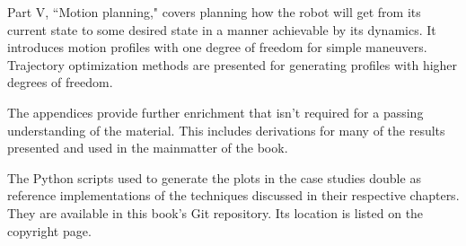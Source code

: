 Part V, ``Motion planning," covers planning how the robot will get from its
current state to some desired state in a manner achievable by its dynamics.
It introduces motion profiles with one degree of freedom for simple maneuvers.
Trajectory optimization methods are presented for generating profiles with
higher degrees of freedom.

The appendices provide further enrichment that isn't required for a passing
understanding of the material. This includes derivations for many of the results
presented and used in the mainmatter of the book.

The Python scripts used to generate the plots in the case studies double as
reference implementations of the techniques discussed in their respective
chapters. They are available in this book's Git repository. Its location is
listed on the copyright page.
